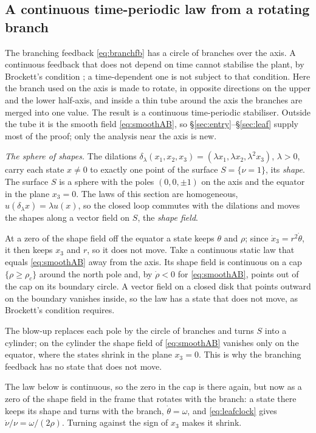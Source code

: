 \documentclass[11pt,reqno]{amsart}
\theoremstyle{plain}
\theoremstyle{definition}
\theoremstyle{remark}
\begin{document}
\subsection{A continuous time-periodic law from a rotating branch}\label{sec:rotating}
The branching feedback \eqref{eq:branchfb} has a circle of branches over the axis. A continuous feedback
that does not depend on time cannot stabilise the plant, by Brockett's condition \cite{Brockett1983}; a
time-dependent one is not subject to that condition. Here the branch used on the axis is made to rotate, in opposite directions on
the upper and the lower half-axis, and inside a thin tube around the axis the branches are merged into one
value. The result
is a continuous time-periodic stabiliser. Outside the tube it is the smooth field \eqref{eq:smoothAB}, so
\S\ref{sec:entry}--\S\ref{sec:leaf} supply most of the proof; only the analysis near the axis is new.

\emph{The sphere of shapes.} The dilations $\delta_\lambda(x_1,x_2,x_3)=(\lambda x_1,\lambda x_2,\lambda^{2}x_3)$,
$\lambda>0$, carry each state $x\neq0$ to exactly one point of the surface $S=\{\nu=1\}$, its \emph{shape}. The
surface $S$ is a sphere with the poles $(0,0,\pm1)$ on the axis and the equator in the plane $x_3=0$. The laws
of this section are homogeneous, $u(\delta_\lambda x)=\lambda u(x)$, so the closed loop commutes with the
dilations and moves the shapes along a vector field on $S$, the \emph{shape field}.

At a zero of the shape
field off the equator a state keeps $\theta$ and $\rho$; since $\dot x_3=r^{2}\dot\theta$, it then keeps $x_3$ and
$r$, so it does not move. Take a continuous static law that equals \eqref{eq:smoothAB} away from the axis. Its
shape field is continuous on a cap $\{\rho\ge\rho_c\}$ around the north pole and, by $\dot\rho<0$ for
\eqref{eq:smoothAB}, points out of the cap on its boundary circle. A vector field on a closed disk that points
outward on the boundary vanishes inside, so the law has a state that does not move, as Brockett's condition
requires.

The blow-up replaces each pole by the circle of branches and turns $S$ into a cylinder; on the
cylinder the shape field of \eqref{eq:smoothAB} vanishes only on the equator, where the states shrink in the
plane $x_3=0$. This is why the branching feedback has no state that does not move.

The law below is
continuous, so the zero in the cap is there again, but now as a zero of the shape field in the frame that
rotates with the branch: a state there keeps its shape and turns with the branch, $\dot\theta=\omega$, and
\eqref{eq:leafclock} gives $\dot\nu/\nu=\omega/(2\rho)$. Turning against the sign of $x_3$ makes it shrink.
\end{document}
